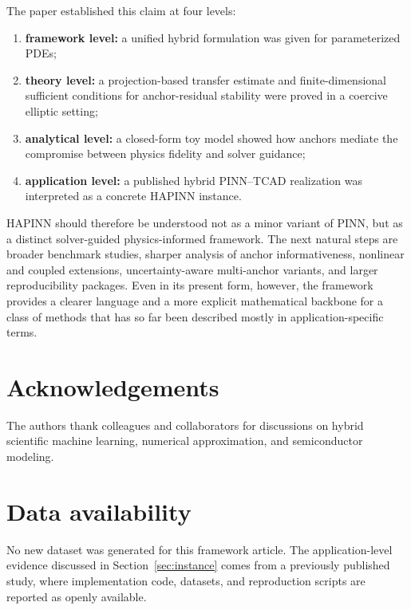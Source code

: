 \documentclass[preprint,12pt]{elsarticle}
\theoremstyle{definition}
\numberwithin{equation}{section}
\begin{document}
The paper established this claim at four levels:
\begin{enumerate}[label=\arabic*)]
    \item \textbf{framework level:} a unified hybrid formulation was given for parameterized PDEs;
    \item \textbf{theory level:} a projection-based transfer estimate and finite-dimensional sufficient conditions for anchor-residual stability were proved in a coercive elliptic setting;
    \item \textbf{analytical level:} a closed-form toy model showed how anchors mediate the compromise between physics fidelity and solver guidance;
    \item \textbf{application level:} a published hybrid PINN--TCAD realization was interpreted as a concrete HAPINN instance.
\end{enumerate}

HAPINN should therefore be understood not as a minor variant of PINN, but as a distinct solver-guided physics-informed framework. The next natural steps are broader benchmark studies, sharper analysis of anchor informativeness, nonlinear and coupled extensions, uncertainty-aware multi-anchor variants, and larger reproducibility packages. Even in its present form, however, the framework provides a clearer language and a more explicit mathematical backbone for a class of methods that has so far been described mostly in application-specific terms.

\section*{Acknowledgements}

The authors thank colleagues and collaborators for discussions on hybrid scientific machine learning, numerical approximation, and semiconductor modeling.

\section*{Data availability}

No new dataset was generated for this framework article. The application-level evidence discussed in Section~\ref{sec:instance} comes from a previously published study, where implementation code, datasets, and reproduction scripts are reported as openly available.
\end{document}
